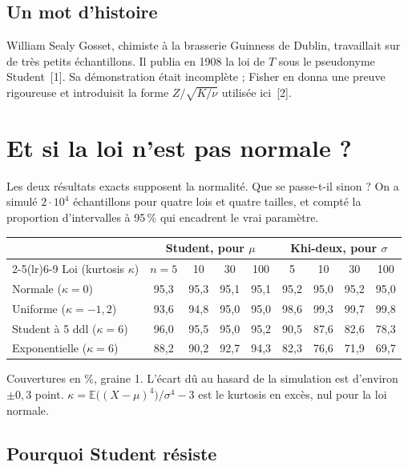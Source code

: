 \documentclass[11pt,a4paper]{article}
\theoremstyle{sj}
\theoremstyle{definition}
\theoremstyle{remark}
\newcommand{\E}{\mathbb{E}}
\providecommand{\og}{\guillemotleft\nobreakspace}
\providecommand{\fg}{\nobreakspace\guillemotright}
\begin{document}
\subsection{Un mot d'histoire}

William Sealy Gosset, chimiste à la brasserie Guinness de Dublin, travaillait sur de très petits échantillons. Il publia en 1908 la loi de $T$ sous le pseudonyme \og Student\fg{}~[1]. Sa démonstration était incomplète ; Fisher en donna une preuve rigoureuse et introduisit la forme $Z/\sqrt{K/\nu}$ utilisée ici~[2].

\section{Et si la loi n'est pas normale ?}\label{sec:robustesse}

Les deux résultats exacts supposent la normalité. Que se passe-t-il sinon ? On a simulé $2\cdot10^4$ échantillons pour quatre lois et quatre tailles, et compté la proportion d'intervalles à 95\,\% qui encadrent le vrai paramètre.

\begin{center}
\small
\begin{tabular}{l c c c c c c c c}
\toprule
& \multicolumn{4}{c}{Student, pour $\mu$} & \multicolumn{4}{c}{Khi-deux, pour $\sigma$}\\
\cmidrule(lr){2-5}\cmidrule(lr){6-9}
Loi (kurtosis $\kappa$) & $n=5$ & 10 & 30 & 100 & 5 & 10 & 30 & 100\\
\midrule
Normale ($\kappa=0$) & 95,3 & 95,3 & 95,1 & 95,1 & 95,2 & 95,0 & 95,2 & 95,0\\
Uniforme ($\kappa=-1{,}2$) & 93,6 & 94,8 & 95,0 & 95,0 & 98,6 & 99,3 & 99,7 & 99,8\\
Student à 5 ddl ($\kappa=6$) & 96,0 & 95,5 & 95,0 & 95,2 & 90,5 & 87,6 & 82,6 & 78,3\\
Exponentielle ($\kappa=6$) & 88,2 & 90,2 & 92,7 & 94,3 & 82,3 & 76,6 & 71,9 & 69,7\\
\bottomrule
\end{tabular}
\end{center}
Couvertures en \%, graine 1. L'écart dû au hasard de la simulation est d'environ $\pm0{,}3$ point. $\kappa=\E\big((X-\mu)^4\big)/\sigma^4-3$ est le kurtosis en excès, nul pour la loi normale.

\subsection{Pourquoi Student résiste}
\end{document}
